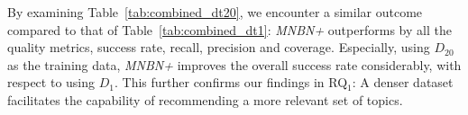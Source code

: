 By examining Table~\ref{tab:combined_dt20}, we encounter a similar outcome 
compared to that of Table~\ref{tab:combined_dt1}: \textit{MNBN+\TF} outperforms 
\MNB by all the quality metrics, \ie success rate, recall, precision and 
coverage. Especially, using $D_{20}$ as the training data, \textit{MNBN+\TF} 
improves the 
overall success rate considerably, with respect to using $D_{1}$. This further 
confirms our findings in RQ$_1$: A denser dataset facilitates the capability of 
recommending a more relevant set of topics. %












